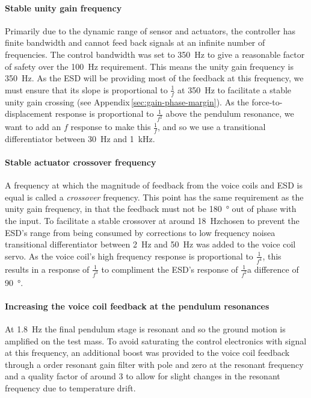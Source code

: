 \paragraph{Stable unity gain frequency}
Primarily due to the dynamic range of sensor and actuators, the controller has finite bandwidth and cannot feed back signals at an infinite number of frequencies. The control bandwidth was set to \SI{350}{\hertz} to give a reasonable factor of safety over the \SI{100}{\hertz} requirement. This means the unity gain frequency is \SI{350}{\hertz}. As the \gls{ESD} will be providing most of the feedback at this frequency, we must ensure that its slope is proportional to $\frac{1}{f}$ at \SI{350}{\hertz} to facilitate a stable unity gain crossing (see Appendix\,\ref{sec:gain-phase-margin}). As the force-to-displacement response is proportional to $\frac{1}{f^2}$ above the pendulum resonance, we want to add an $f$ response to make this $\frac{1}{f}$, and so we use a transitional differentiator between \SI{30}{\hertz} and \SI{1}{\kilo\hertz}.

\paragraph{Stable actuator crossover frequency}
A frequency at which the magnitude of feedback from the voice coils and \gls{ESD} is equal is called a \emph{crossover} frequency. This point has the same requirement as the unity gain frequency, in that the feedback must not be \SI{180}{\degree} out of phase with the input. To facilitate a stable crossover at around \SI{18}{\hertz}\textemdash chosen to prevent the \gls{ESD}'s range from being consumed by corrections to low frequency noise\textemdash a transitional differentiator between \SI{2}{\hertz} and \SI{50}{\hertz} was added to the voice coil servo. As the voice coil's high frequency response is proportional to $\frac{1}{f^4}$, this results in a response of $\frac{1}{f^3}$ to compliment the \gls{ESD}'s response of $\frac{1}{f^2}$\textemdash a difference of \SI{90}{\degree}.

\paragraph{Increasing the voice coil feedback at the pendulum resonances}
At \SI{1.8}{\hertz} the final pendulum stage is resonant and so the ground motion is amplified on the test mass. To avoid saturating the control electronics with signal at this frequency, an additional boost was provided to the voice coil feedback through a  order resonant gain filter with pole and zero at the resonant frequency and a quality factor of around \num{3} to allow for slight changes in the resonant frequency due to temperature drift.

